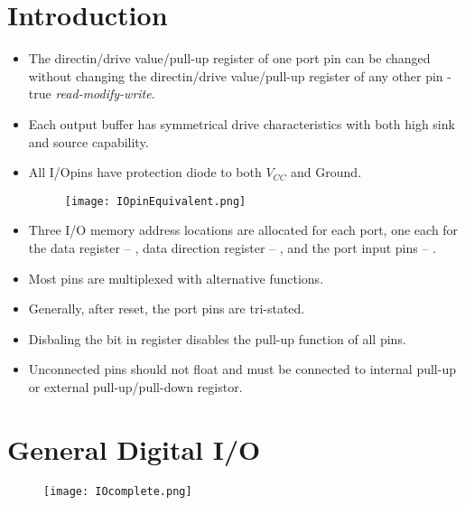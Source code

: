 


% 

\section{Introduction}
\begin{itemize}
    \item The directin/drive value/pull-up register of one port pin can be changed without changing the directin/drive value/pull-up register  of any other pin - true \emph{read-modify-write}.
    \item Each output buffer has symmetrical drive characteristics with both high sink and source capability.
    \item All I/Opins have protection diode to both $V_{CC}$ and Ground.
    \begin{figure}[H]
        \begin{center}
            \texttt{[image: IOpinEquivalent.png]}
        \end{center}
    \end{figure}
    \item Three I/O memory address locations are allocated for each port, one each for the data register – , data direction register – , and the port input pins – .
    \item Most pins are multiplexed with alternative functions.
    \item Generally, after reset, the port pins are tri-stated.
    \item Disbaling the  bit in  register disables the pull-up function of all pins.
    \item Unconnected pins should not float and must be connected to internal pull-up or external pull-up/pull-down registor.
\end{itemize}


\section{General Digital I/O}
\begin{figure}[H]
    \begin{center}
        \texttt{[image: IOcomplete.png]}
    \end{center}
\end{figure}


